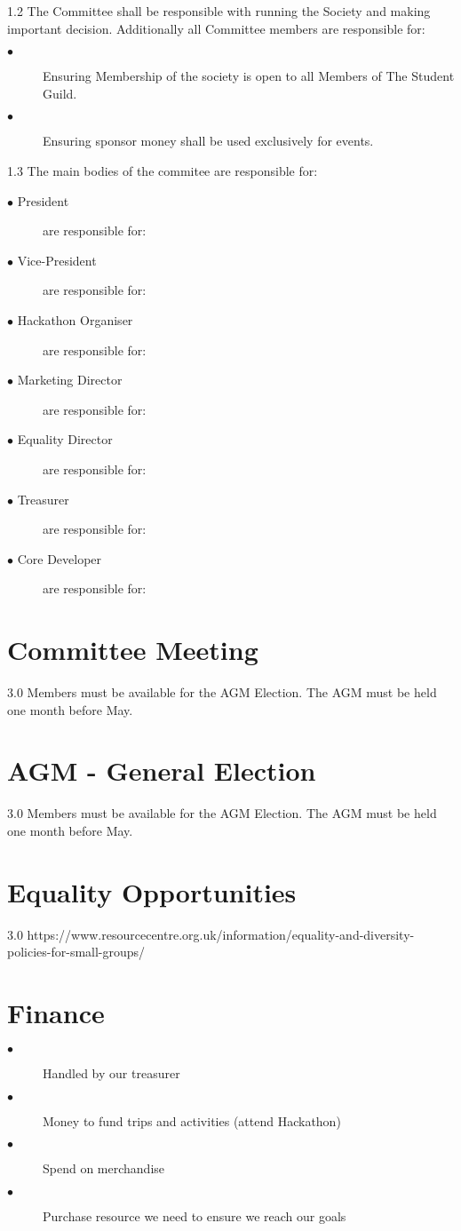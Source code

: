 \documentclass{report}
\begin{document}
  1.2 The Committee shall be responsible with running the Society and making important decision. Additionally all Committee members are responsible for:
  
  \begin{description}
    \item[$\bullet$]Ensuring Membership of the society is open to all Members of The Student Guild.
    \item[$\bullet$]Ensuring sponsor money shall be used exclusively for events.
  \end{description}
  
  1.3 The main bodies of the commitee are responsible for:
  
  \begin{description}
    \item[$\bullet$ President] are responsible for:
    \item[$\bullet$ Vice-President] are responsible for: 
    \item[$\bullet$ Hackathon Organiser] are responsible for: 
    \item[$\bullet$ Marketing Director] are responsible for: 
    \item[$\bullet$ Equality Director] are responsible for: 
    \item[$\bullet$ Treasurer] are responsible for: 
    \item[$\bullet$ Core Developer] are responsible for: 
  \end{description}
  
  \section{Committee Meeting}
  3.0 Members must be available for the AGM Election. The AGM must be held one month before May.
  
  \section{AGM - General Election}
  3.0 Members must be available for the AGM Election. The AGM must be held one month before May.
  
  
  \section{Equality Opportunities}
  3.0 https://www.resourcecentre.org.uk/information/equality-and-diversity-policies-for-small-groups/
  
  \section{Finance}
  \begin{description}
    \item[$\bullet$] Handled by our treasurer
    \item[$\bullet$] Money to fund trips and activities (attend Hackathon)
    \item[$\bullet$] Spend on merchandise
    \item[$\bullet$] Purchase resource we need to ensure we reach our goals
  \end{description}
  
\end{document}
